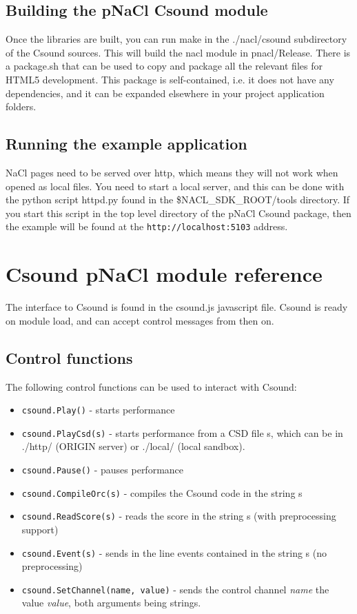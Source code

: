 \documentclass[11pt]{article}
\begin{document}
\subsection{Building the pNaCl Csound module}

Once the libraries are built, you can run make in the ./nacl/csound subdirectory of the Csound sources. This will build the
nacl module in  pnacl/Release. There is a package.sh that can be used to copy and package all the relevant files for 
HTML5 development. This package is self-contained, i.e. it does not have any dependencies, and it can be expanded
elsewhere in your project application folders. 


\subsection{Running the example application}

NaCl pages need to be served over http, which means they will not work when opened as local files. You need to start a local server,
and this can be done with the python script httpd.py found in the \$NACL\_SDK\_ROOT/tools directory. If you start this script 
in the top level directory of the pNaCl Csound package, then the example will be found at the {\tt http://localhost:5103} address.

\section{Csound pNaCl module reference}

The interface to Csound is found in the csound.js javascript file. Csound is ready on module load, and can accept control messages
from then on.

\subsection{Control functions}

The following control functions can be used to interact with Csound:

\begin{itemize}
\item {\tt csound.Play()} - starts performance
\item {\tt csound.PlayCsd(s)} - starts performance from a CSD file s, which can be in ./http/ (ORIGIN server) or ./local/ (local sandbox).
\item {\tt csound.Pause()} - pauses performance
\item {\tt csound.CompileOrc(s)} - compiles the Csound code in the string s
\item {\tt csound.ReadScore(s)} - reads the score in the string s (with preprocessing support)
\item {\tt csound.Event(s)} - sends in the line events contained in the string s (no preprocessing)
\item {\tt csound.SetChannel(name, value)} - sends the control channel \emph{name} the value \emph{value}, both arguments being strings.
\end{itemize}
\end{document}
